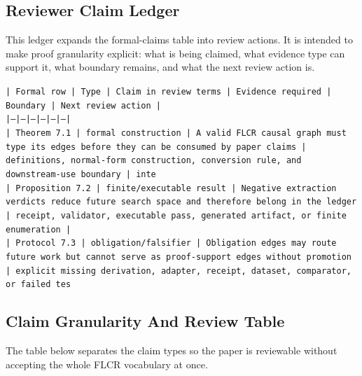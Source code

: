 \documentclass[11pt]{article}
\begin{document}
\subsection*{Reviewer Claim Ledger}

This ledger expands the formal-claims table into review actions. It is intended to make proof granularity explicit: what is being claimed, what evidence type can support it, what boundary remains, and what the next review action is.

\noindent\texttt{| Formal row | Type | Claim in review terms | Evidence required | Boundary | Next review action |}\\
\noindent\texttt{|---|---|---|---|---|---|}\\
\noindent\texttt{| Theorem 7.1 | formal construction | A valid FLCR causal graph must type its edges before they can be consumed by paper claims | definitions, normal-form construction, conversion rule, and downstream-use boundary | inte}\\
\noindent\texttt{| Proposition 7.2 | finite/executable result | Negative extraction verdicts reduce future search space and therefore belong in the ledger | receipt, validator, executable pass, generated artifact, or finite enumeration |}\\
\noindent\texttt{| Protocol 7.3 | obligation/falsifier | Obligation edges may route future work but cannot serve as proof-support edges without promotion | explicit missing derivation, adapter, receipt, dataset, comparator, or failed tes}\\

\subsection*{Claim Granularity And Review Table}

The table below separates the claim types so the paper is reviewable without accepting the whole FLCR vocabulary at once.
\end{document}
